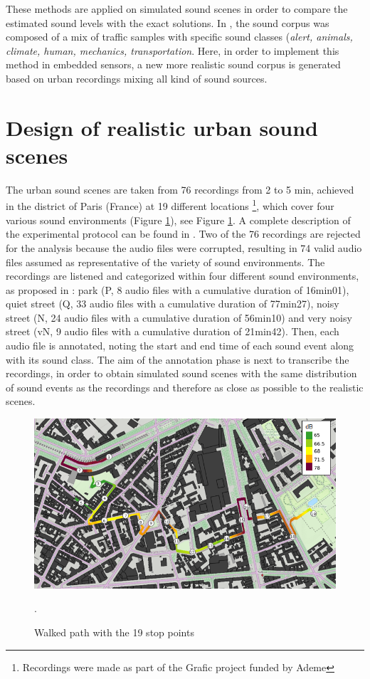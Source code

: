 \documentclass[review,5p,twocolumn,sort&compress,times]{elsarticle}
\begin{document}
These methods are applied on simulated sound scenes in order to compare the estimated sound levels with the exact solutions. In \cite{}, the sound corpus was composed of a mix of traffic samples with specific sound classes (\textit{alert, animals, climate, human, mechanics, transportation}. Here, in order to implement this method in embedded sensors, a new more realistic sound corpus is generated based on urban recordings mixing all kind of sound sources.

\section{Design of realistic urban sound scenes}\label{part:urban_scene}

The urban sound scenes are taken from 76 recordings from 2 to 5 min, achieved in the  district of Paris (France) at 19 different locations \footnote{Recordings were made as part of the Grafic project funded by Ademe}, which cover four various sound environments (Figure \ref{fig:map_grafic}), see Figure \ref{fig:map_grafic}. A complete description of the experimental protocol can be found in \cite{aumond_modelling_2017}. Two of the 76 recordings are rejected for the analysis because the audio files were corrupted, resulting in 74 valid audio files assumed as representative of the variety of sound environments. The recordings are listened and categorized within four different sound environments, as proposed in \cite{can_describing_2015}: park (P, 8 audio files with a cumulative duration of 16min01), quiet street (Q, 33 audio files with a cumulative duration of 77min27), noisy street (N, 24 audio files with a cumulative duration of 56min10) and very noisy street (vN, 9 audio files with a cumulative duration of 21min42). Then, each audio file is annotated, noting the start and end time of each sound event along with its sound class. The aim of the annotation phase is next to transcribe the recordings, in order to obtain simulated sound scenes with the same distribution of sound events as the recordings and therefore as close as possible to the realistic scenes. 

\begin{figure}[t]
\centering
\includegraphics[width=\linewidth]{./figures/trajet_19pts.png}
\caption{Walked path with the 19 stop points  \cite{aumond_modelling_2017}}.
\label{fig:map_grafic}
\end{figure}
\end{document}
